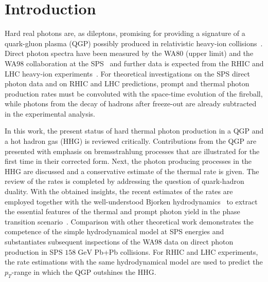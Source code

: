 \documentclass[12pt,twoside,fleqn]{article}
\newcommand{\GeV}{\mbox{GeV}}
\begin{document}
%
\newpage
%
\renewcommand{\thefootnote}{\arabic{footnote}}
\setcounter{footnote}{0}
%
\section{Introduction}
\label{Introduction}
%
Hard real photons are, as dileptons, promising for providing a signature of a
quark-gluon plasma (QGP) possibly produced in relativistic heavy-ion
collisions~\cite{RUUSKANEN_1992}. Direct photon spectra have been measured by
the WA80 (upper limit) and the WA98 collaboration at the
SPS~\cite{WA80_1996,WA98_2000} and further data is expected from the RHIC and
LHC heavy-ion experiments~\cite{PHENIX_1998,ALICE_1995_96}. For theoretical
investigations on the SPS direct photon data and on RHIC and LHC predictions,
prompt and thermal photon production rates must be convoluted with the
space-time evolution of the fireball, while photons from the decay of hadrons
after freeze-out are already subtracted in the experimental analysis.

In this work, the present status of hard thermal photon production in a QGP and
a hot hadron gas (HHG) is reviewed critically. Contributions from the QGP are
presented with emphasis on bremsstrahlung processes that are illustrated for the
first time in their corrected form. Next, the photon producing processes in the
HHG are discussed and a conservative estimate of the thermal rate is given. The
review of the rates is completed by addressing the question of quark-hadron
duality.  With the obtained insights, the recent estimates of the rates are
employed together with the well-understood Bjorken
hydrodynamics~\cite{BJORKEN_1983,GYULASSY_1984} to extract the essential
features of the thermal and prompt photon yield in the phase transition
scenario~\cite{SATZ_1994}. Comparison with other theoretical work demonstrates
the competence of the simple hydrodynamical model at SPS energies and
substantiates subsequent inspections of the WA98 data on direct photon
production in SPS $158\;\GeV$ Pb+Pb collisions. For RHIC and LHC experiments,
the rate estimations with the same hydrodynamical model are used to predict the
$p_T$-range in which the QGP outshines the HHG.
%
\end{document}

